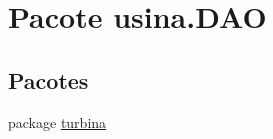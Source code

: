 \hypertarget{namespaceusina_1_1_d_a_o}{\section{Pacote usina.\-D\-A\-O}
\label{namespaceusina_1_1_d_a_o}
}
\subsection*{Pacotes}
\begin{DoxyCompactItemize}
\item 
package \hyperlink{namespaceusina_1_1_d_a_o_1_1turbina}{turbina}
\end{DoxyCompactItemize}
